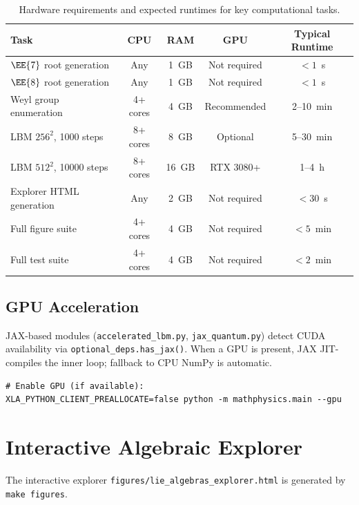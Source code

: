 \begin{table}[ht]
\centering
\begin{tabular}{lcccc}
\toprule
\textbf{Task} & \textbf{CPU} & \textbf{RAM} & \textbf{GPU} &
\textbf{Typical Runtime} \\
\midrule
$\EE{7}$ root generation & Any & 1~GB & Not required & $< 1$~s \\
$\EE{8}$ root generation & Any & 1~GB & Not required & $< 1$~s \\
Weyl group enumeration & 4+ cores & 4~GB & Recommended & 2--10~min \\
LBM $256^2$, 1000 steps & 8+ cores & 8~GB & Optional & 5--30~min \\
LBM $512^2$, 10000 steps & 8+ cores & 16~GB & RTX 3080+ & 1--4~h \\
Explorer HTML generation & Any & 2~GB & Not required & $< 30$~s \\
Full figure suite & 4+ cores & 4~GB & Not required & $< 5$~min \\
Full test suite & 4+ cores & 4~GB & Not required & $< 2$~min \\
\bottomrule
\end{tabular}
\caption{Hardware requirements and expected runtimes for key computational tasks.}
\label{tab:hardware_requirements}
\end{table}

\subsection{GPU Acceleration}

JAX-based modules (\texttt{accelerated\_lbm.py}, \texttt{jax\_quantum.py})
detect CUDA availability via \texttt{optional\_deps.has\_jax()}.  When a
GPU is present, JAX JIT-compiles the inner loop; fallback to CPU NumPy is
automatic.

\begin{verbatim}
# Enable GPU (if available):
XLA_PYTHON_CLIENT_PREALLOCATE=false python -m mathphysics.main --gpu
\end{verbatim}

\section{Interactive Algebraic Explorer}
\label{app:explorer}

The interactive explorer \texttt{figures/lie\_algebras\_explorer.html} is
generated by \texttt{make figures}.


